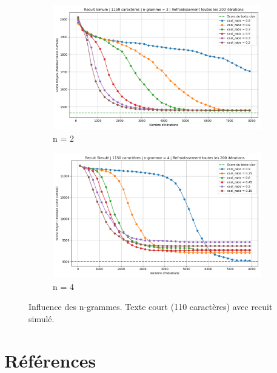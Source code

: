 \documentclass[a4paper]{article}
\begin{document}
\begin{figure}[H]
    \centering
    \begin{subfigure}[b]{0.49\textwidth}
        \includegraphics[width=\textwidth]{graphe_recuit_n_2_1150_cool_time_200.png}
        \caption{n = 2}
        \label{fig:n2-1150-200}
    \end{subfigure}
    \hfill
    \begin{subfigure}[b]{0.49\textwidth}
        \includegraphics[width=\textwidth]{graphe_recuit_n_4_1150_cool_time_200.png}
        \caption{n = 4}
        \label{fig:n4-1150-200}
    \end{subfigure}
    \caption{Influence des n-grammes. Texte court (110 caractères) avec recuit simulé.}
    \label{fig:rs-n2-n4-1150}
\end{figure}

\label{sec:annexes}
\section*{Références}
\end{document}
